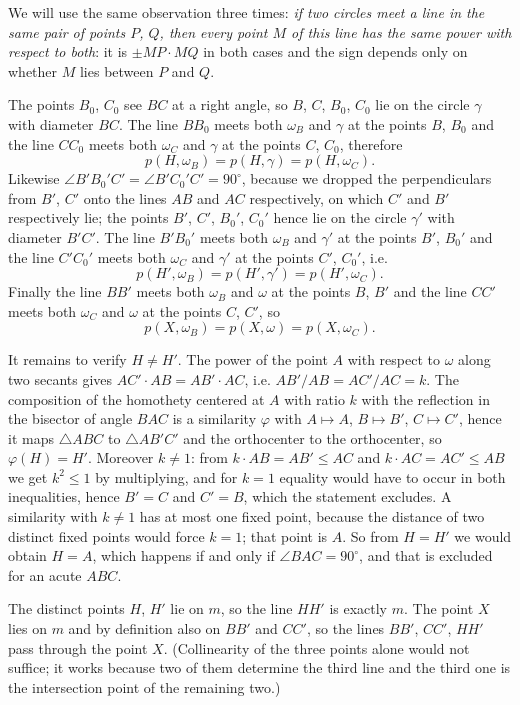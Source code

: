 {    We will use the same observation three times: \textit{if two circles meet a line in the same pair of points $P$, $Q$, then every point $M$ of this line has the same power with respect to both}: it is $\pm MP \cdot MQ$ in both cases and the sign depends only on whether $M$ lies between $P$ and $Q$.

    The points $B_0$, $C_0$ see $BC$ at a right angle, so $B$, $C$, $B_0$, $C_0$ lie on the circle $\gamma$ with diameter $BC$. The line $BB_0$ meets both $\omega_B$ and $\gamma$ at the points $B$, $B_0$ and the line $CC_0$ meets both $\omega_C$ and $\gamma$ at the points $C$, $C_0$, therefore
    $$
    p(H,\omega_B) = p(H,\gamma) = p(H,\omega_C).
    $$
    Likewise $\angle B'B_0'C' = \angle B'C_0'C' = 90^\circ$, because we dropped the perpendiculars from $B'$, $C'$ onto the lines $AB$ and $AC$ respectively, on which $C'$ and $B'$ respectively lie; the points $B'$, $C'$, $B_0'$, $C_0'$ hence lie on the circle $\gamma'$ with diameter $B'C'$. The line $B'B_0'$ meets both $\omega_B$ and $\gamma'$ at the points $B'$, $B_0'$ and the line $C'C_0'$ meets both $\omega_C$ and $\gamma'$ at the points $C'$, $C_0'$, i.e.
    $$
    p(H',\omega_B) = p(H',\gamma') = p(H',\omega_C).
    $$
    Finally the line $BB'$ meets both $\omega_B$ and $\omega$ at the points $B$, $B'$ and the line $CC'$ meets both $\omega_C$ and $\omega$ at the points $C$, $C'$, so
    $$
    p(X,\omega_B) = p(X,\omega) = p(X,\omega_C).
    $$

    It remains to verify $H \neq H'$. The power of the point $A$ with respect to $\omega$ along two secants gives $AC' \cdot AB = AB' \cdot AC$, i.e. $AB'/AB = AC'/AC = k$. The composition of the homothety centered at $A$ with ratio $k$ with the reflection in the bisector of angle $BAC$ is a similarity $\varphi$ with $A \mapsto A$, $B \mapsto B'$, $C \mapsto C'$, hence it maps $\triangle ABC$ to $\triangle AB'C'$ and the orthocenter to the orthocenter, so $\varphi(H) = H'$. Moreover $k \neq 1$: from $k \cdot AB = AB' \leq AC$ and $k \cdot AC = AC' \leq AB$ we get $k^2 \leq 1$ by multiplying, and for $k = 1$ equality would have to occur in both inequalities, hence $B' = C$ and $C' = B$, which the statement excludes. A similarity with $k \neq 1$ has at most one fixed point, because the distance of two distinct fixed points would force $k = 1$; that point is $A$. So from $H = H'$ we would obtain $H = A$, which happens if and only if $\angle BAC = 90^\circ$, and that is excluded for an acute $ABC$.

    The distinct points $H$, $H'$ lie on $m$, so the line $HH'$ is exactly $m$. The point $X$ lies on $m$ and by definition also on $BB'$ and $CC'$, so the lines $BB'$, $CC'$, $HH'$ pass through the point $X$. (Collinearity of the three points alone would not suffice; it works because two of them determine the third line and the third one is the intersection point of the remaining two.)
}

